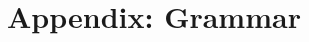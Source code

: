 \chapter{Appendix: \uclid{} Grammar}

\setlength{\grammarparsep}{20pt plus 1pt minus 1pt} %
\setlength{\grammarindent}{12em} %

\begin{grammar}



\end{grammar}
